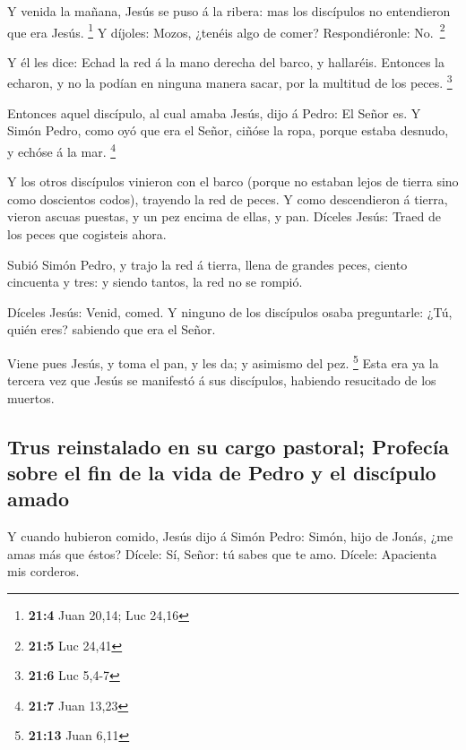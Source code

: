  Y venida la mañana, Jesús se puso á la ribera: mas los
discípulos no entendieron que era Jesús. \footnote{\textbf{21:4} Juan
  20,14; Luc 24,16}  Y díjoles: Mozos, ¿tenéis algo de
comer? Respondiéronle: No.~\footnote{\textbf{21:5} Luc 24,41}

 Y él les dice: Echad la red á la mano derecha del barco,
y hallaréis. Entonces la echaron, y no la podían en ninguna manera
sacar, por la multitud de los peces. \footnote{\textbf{21:6} Luc 5,4-7}

 Entonces aquel discípulo, al cual amaba Jesús, dijo á
Pedro: El Señor es. Y Simón Pedro, como oyó que era el Señor, ciñóse la
ropa, porque estaba desnudo, y echóse á la mar. \footnote{\textbf{21:7}
  Juan 13,23}

 Y los otros discípulos vinieron con el barco (porque no
estaban lejos de tierra sino como doscientos codos), trayendo la red de
peces.  Y como descendieron á tierra, vieron ascuas
puestas, y un pez encima de ellas, y pan.  Díceles Jesús:
Traed de los peces que cogisteis ahora.

 Subió Simón Pedro, y trajo la red á tierra, llena de
grandes peces, ciento cincuenta y tres: y siendo tantos, la red no se
rompió.

 Díceles Jesús: Venid, comed. Y ninguno de los discípulos
osaba preguntarle: ¿Tú, quién eres? sabiendo que era el Señor.

 Viene pues Jesús, y toma el pan, y les da; y asimismo
del pez. \footnote{\textbf{21:13} Juan 6,11}  Esta era ya
la tercera vez que Jesús se manifestó á sus discípulos, habiendo
resucitado de los muertos.

\hypertarget{trus-reinstalado-en-su-cargo-pastoral-profecuxeda-sobre-el-fin-de-la-vida-de-pedro-y-el-discuxedpulo-amado}{%
\subsection{Trus reinstalado en su cargo pastoral; Profecía sobre el fin
de la vida de Pedro y el discípulo
amado}\label{trus-reinstalado-en-su-cargo-pastoral-profecuxeda-sobre-el-fin-de-la-vida-de-pedro-y-el-discuxedpulo-amado}}

 Y cuando hubieron comido, Jesús dijo á Simón Pedro:
Simón, hijo de Jonás, ¿me amas más que éstos? Dícele: Sí, Señor: tú
sabes que te amo. Dícele: Apacienta mis corderos.

